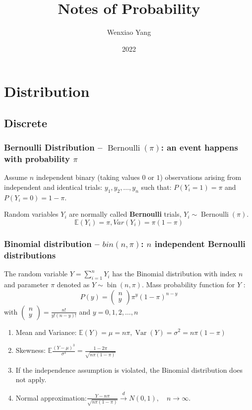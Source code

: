 \documentclass[11pt]{elegantbook}
\title{Notes of Probability}
\author{Wenxiao Yang}
\institute{Department of Mathematics, University of Illinois at Urbana-Champaign}
\date{2022}
\begin{document}
\maketitle

\frontmatter
\tableofcontents

\mainmatter

\chapter{Distribution}

\section{Discrete}
\subsection{Bernoulli Distribution -- $\operatorname{Bernoulli}(\pi)$: an event happens with probability $\pi$}
Assume $n$ independent binary (taking values $0$ or $1$) observations arising from independent and identical trials: $y_{1}, y_{2}, \ldots, y_{n}$ such that: $P\left(Y_{i}=1\right)=\pi$ and $P\left(Y_{i}=0\right)=1-\pi$.

Random variables $Y_{i}$ are normally called \textbf{Bernoulli} trials, $Y_{i} \sim \operatorname{Bernoulli}(\pi)$. $$\mathbb{E}(Y_i)=\pi,Var(Y_i)=\pi(1-\pi)$$

\subsection{Binomial distribution -- $bin(n,\pi)$: $n$ independent Bernoulli distributions}
The random variable $Y=\sum_{i=1}^{n} Y_{i}$ has the Binomial distribution with index $n$ and parameter $\pi$ denoted as $Y \sim \operatorname{bin}(n, \pi)$.
Mass probability function for $Y$ :
$$
P(y)=\left(\begin{array}{l}
n \\
y
\end{array}\right) \pi^{y}(1-\pi)^{n-y}
$$
with $\left(\begin{array}{l}n \\ y\end{array}\right)=\frac{n !}{y !(n-y) !}$ and $y=0,1,2, \ldots, n$
\begin{enumerate}[(1)]
    \item Mean and Variance:
    $\mathbb{E}(Y)=\mu=n \pi,\operatorname{Var}(Y)=\sigma^{2}=n \pi(1-\pi)$
    \item Skewness: $\mathbb{E}\frac{(Y-\mu)^{3}}{\sigma^{3}}=\frac{1-2 \pi}{\sqrt{n \pi(1-\pi)}}$
    \item If the independence assumption is violated, the Binomial distribution does not apply.
    \item Normal approximation:$\frac{Y-n \pi}{\sqrt{n \pi(1-\pi)}} \stackrel{d}{\longrightarrow} N(0,1),\quad {n \rightarrow \infty}$.
\end{enumerate}
\end{document}

